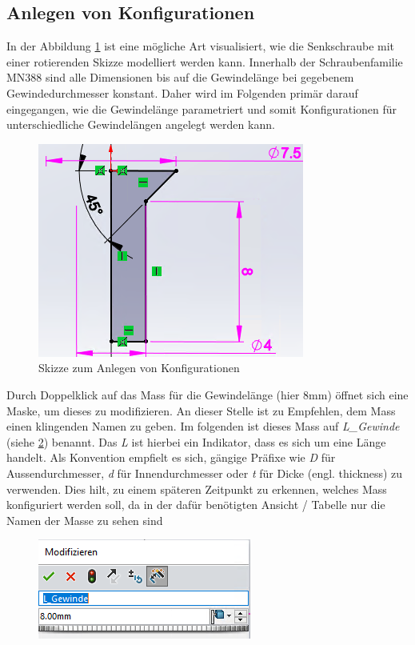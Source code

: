 \documentclass[12pt,a4paper]{article}
\begin{document}
	\subsection{Anlegen von Konfigurationen}
	In der Abbildung \ref{fig:Skizze} ist eine mögliche Art visualisiert, wie die Senkschraube mit einer rotierenden Skizze modelliert werden kann. Innerhalb der Schraubenfamilie MN388 sind alle Dimensionen bis auf die Gewindelänge bei gegebenem Gewindedurchmesser konstant. Daher wird im Folgenden primär darauf eingegangen, wie die Gewindelänge parametriert und somit Konfigurationen für unterschiedliche Gewindelängen angelegt werden kann.
	\begin{figure}[H]
		\centering
		\includegraphics[width=.4\linewidth]{310123_CAD_PDM/screenshot003}
		\caption{Skizze zum Anlegen von Konfigurationen}
		\label{fig:Skizze}
	\end{figure}
	\noindent
	Durch Doppelklick auf das Mass für die Gewindelänge (hier 8mm) öffnet sich eine Maske, um dieses zu modifizieren. An dieser Stelle ist zu Empfehlen, dem Mass einen klingenden Namen zu geben. Im folgenden ist dieses Mass auf \textit{L\_Gewinde} (siehe \ref{fig:screenshot004}) benannt. Das \textit{L} ist hierbei ein Indikator, dass es sich um eine Länge handelt. Als Konvention empfielt es sich, gängige Präfixe wie \textit{D} für Aussendurchmesser, \textit{d} für Innendurchmesser oder \textit{t} für Dicke (engl. thickness) zu verwenden. Dies hilt, zu einem späteren Zeitpunkt zu erkennen, welches Mass konfiguriert werden soll, da in der dafür benötigten Ansicht / Tabelle nur die Namen der Masse zu sehen sind
	\begin{figure}[H]
		\centering
		\includegraphics[width=.4\linewidth]{310123_CAD_PDM/screenshot004}
		\caption{}
		\label{fig:screenshot004}
	\end{figure}\noindent
\end{document}

